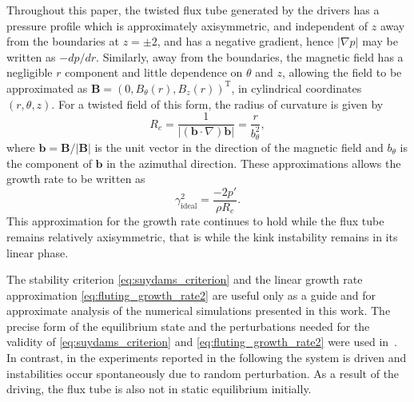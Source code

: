 \documentclass[fleqn,usenatbib]{mnras}
\newcommand{\rs}[2]{{#2}}
\renewcommand{\vec}[1]{{\bm #1}}
\begin{document}
Throughout this \rs{chapter}{paper}, the twisted flux tube generated by the drivers has a pressure profile which is approximately axisymmetric, and independent of $z$ away from the boundaries at $z=\pm2$, and has a negative gradient, hence $|\nabla p|$ may be written as $-d p/ dr$. Similarly, away from the boundaries, the magnetic field has a negligible $r$ component and little dependence on $\theta$ and $z$, allowing the field to be approximated as $\vec{B} = (0, B_{\theta}(r), B_z(r))^{\text{T}}$, in cylindrical coordinates $(r, \theta, z)$. For a twisted field of this form, the radius of curvature is given by 
\begin{equation}
  \label{eq:radius_of_curvature}
  R_c = \frac{1}{|(\vec{b}\cdot\nabla) \vec{b}|} = \frac{r}{b_{\theta}^2},
\end{equation}
where $\vec{b} = \vec{B}/|\vec{B}|$ is the unit vector in the direction of the magnetic field and $b_{\theta}$ is the component of $\vec{b}$ in the azimuthal direction. These approximations allows the growth rate to be written as
\begin{equation}
  \label{eq:fluting_growth_rate2}
\gamma_{\rs{{ideal}}{\text{ideal}}}^2 = \frac{-2p'}{\rho R_c}.
\end{equation}
This \rs{growth rate remains applicable}{approximation for the growth rate continues to hold} while the flux tube remains relatively axisymmetric, that is while the kink instability remains in its linear phase.

\rs{In contrast to the precise form of the equilibrium state and
  perturbation studied in~\citep{quinnEffectAnisotropicViscosity2020},
  this is an experiment where a system is driven and instabilities
  occur organically as a result of noise providing a random
  perturbation. As a result of the driving, the flux tube is not in
  static equilibrium. Consequently, the stability criterion and linear
  growth rate presented previously are useful only as a guide and for
  approximate comparison.}{The stability criterion
  \eqref{eq:suydams_criterion} and the linear
  growth rate approximation \eqref{eq:fluting_growth_rate2} are useful
  only as a guide and for 
  approximate analysis of the numerical simulations presented in this
  work.  The precise form of the equilibrium state and the
  perturbations needed for the validity of
  \eqref{eq:suydams_criterion} and \eqref{eq:fluting_growth_rate2}
  were used in~\citep{quinnEffectAnisotropicViscosity2020}.
  In contrast, in the experiments reported in the following the system
  is driven and instabilities occur spontaneously due to random
  perturbation. As a result of the driving, the flux tube is also not
  in static equilibrium initially. }
\end{document}
